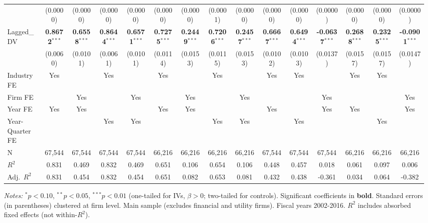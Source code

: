 \begin{landscape}
\begin{table}[H]
\begin{tabular}{lcccccccccccccc}
 & (0.0000) & (0.0000) & (0.0000) & (0.0000) & (0.0000) & (0.0000) & (0.0001) & (0.0000) & (0.0000) & (0.0000) & (0.0000) & (0.0000) & (0.0000) & (0.0000) \\
Lagged\_DV & \textbf{0.8672}$^{***}$ & \textbf{0.6558}$^{***}$ & \textbf{0.8644}$^{***}$ & \textbf{0.6571}$^{***}$ & \textbf{0.7275}$^{***}$ & \textbf{0.2449}$^{***}$ & \textbf{0.7206}$^{***}$ & \textbf{0.2457}$^{***}$ & \textbf{0.6667}$^{***}$ & \textbf{0.6494}$^{***}$ & \textbf{-0.0637}$^{***}$ & \textbf{0.2688}$^{***}$ & \textbf{0.2325}$^{***}$ & \textbf{-0.0901}$^{***}$ \\
 & (0.0060) & (0.0101) & (0.0061) & (0.0101) & (0.0114) & (0.0153) & (0.0115) & (0.0153) & (0.0102) & (0.0103) & (0.0137) & (0.0157) & (0.0157) & (0.0147) \\
\midrule
Industry FE & Yes &  & Yes &  & Yes &  & Yes &  & Yes & Yes &  & Yes & Yes &  \\
Firm FE &  & Yes &  & Yes &  & Yes &  & Yes &  &  & Yes &  &  & Yes \\
Year FE & Yes & Yes &  &  & Yes & Yes &  &  & Yes &  & Yes & Yes &  & Yes \\
Year-Quarter FE &  &  & Yes & Yes &  &  & Yes & Yes &  & Yes &  &  & Yes &  \\
\midrule
N & 67,544 & 67,544 & 67,544 & 67,544 & 66,216 & 66,216 & 66,216 & 66,216 & 67,544 & 67,544 & 67,544 & 66,216 & 66,216 & 66,216 \\
$R^2$ & 0.831 & 0.469 & 0.832 & 0.469 & 0.651 & 0.106 & 0.654 & 0.106 & 0.448 & 0.457 & 0.018 & 0.061 & 0.097 & 0.006 \\
Adj.~$R^2$ & 0.831 & 0.454 & 0.832 & 0.454 & 0.651 & 0.082 & 0.653 & 0.081 & 0.432 & 0.438 & -0.361 & 0.034 & 0.064 & -0.382 \\
\bottomrule
\end{tabular}
\begin{minipage}{\linewidth}
\vspace{2pt}\scriptsize
\textit{Notes:} $^{*}p<0.10$, $^{**}p<0.05$, $^{***}p<0.01$ (one-tailed for IVs, $\beta > 0$; two-tailed for controls).
 Significant coefficients in \textbf{bold}.
 Standard errors (in parentheses) clustered at firm level.
 Main sample (excludes financial and utility firms). Fiscal years 2002-2016.
 $R^2$ includes absorbed fixed effects (not within-$R^2$).
\end{minipage}
\end{table}
\end{landscape}
